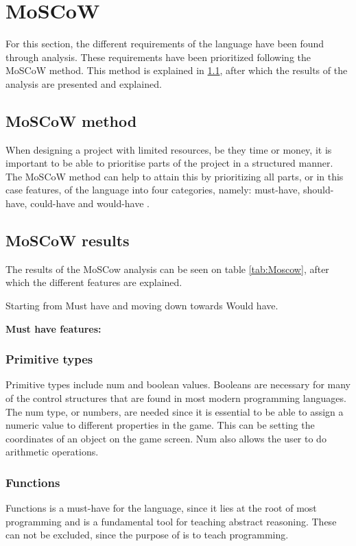 \section{MoSCoW}
For this section, the different requirements of the \lang{} language have been found through analysis. These requirements have been prioritized following the MoSCoW method. This method is explained in \ref{subsec:moscowmethod}, after which the results of the analysis are presented and explained.

\subsection{MoSCoW method}
\label{subsec:moscowmethod}
When designing a project with limited resources, be they time or money, it is important to be able to prioritise parts of the project in a structured manner. The MoSCoW method can help to attain this by prioritizing all parts, or in this case features, of the language into four categories, namely: must-have, should-have, could-have and would-have \citep{MOWSCOW}.


\subsection{MoSCoW results}
The results of the MoSCow analysis can be seen on table \ref{tab:Moscow}, after which the different features are explained.



Starting from Must have and moving down towards Would have.

\Large \textbf{Must have features:} \normalsize \vspace{-7mm}
\subsubsection*{Primitive types}
Primitive types include num and boolean values. Booleans are necessary for many of the control structures that are found in most modern programming languages. The num type, or numbers, are needed since it is essential to be able to assign a numeric value to different properties in the game. This can be setting the coordinates of an object on the game screen. Num also allows the user to do arithmetic operations. 

\subsubsection*{Functions}
Functions is a must-have for the \lang{} language, since it lies at the root of most programming and is a fundamental tool for teaching abstract reasoning. These can not be excluded, since the purpose of \lang{} is to teach programming.

